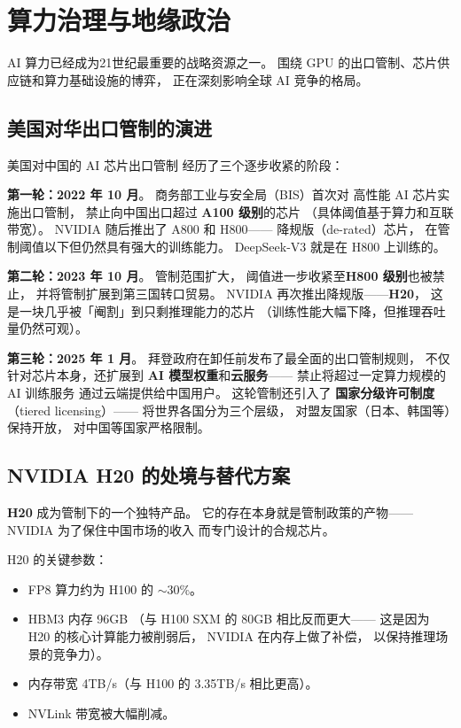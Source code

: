 \section{算力治理与地缘政治}
\label{sec:compute-governance}

AI 算力已经成为21世纪最重要的战略资源之一。
围绕 GPU 的出口管制、芯片供应链和算力基础设施的博弈，
正在深刻影响全球 AI 竞争的格局。

\subsection{美国对华出口管制的演进}

美国对中国的 AI 芯片出口管制
经历了三个逐步收紧的阶段：

\textbf{第一轮：2022 年 10 月}。
商务部工业与安全局（BIS）首次对
高性能 AI 芯片实施出口管制，
禁止向中国出口超过
\textbf{A100 级别}的芯片
（具体阈值基于算力和互联带宽）。
NVIDIA 随后推出了 A800 和 H800——
降规版（de-rated）芯片，
在管制阈值以下但仍然具有强大的训练能力。
DeepSeek-V3 就是在 H800 上训练的。

\textbf{第二轮：2023 年 10 月}。
管制范围扩大，
阈值进一步收紧至\textbf{H800 级别}也被禁止，
并将管制扩展到第三国转口贸易。
NVIDIA 再次推出降规版——\textbf{H20}，
这是一块几乎被「阉割」到只剩推理能力的芯片
（训练性能大幅下降，但推理吞吐量仍然可观）。

\textbf{第三轮：2025 年 1 月}。
拜登政府在卸任前发布了最全面的出口管制规则，
不仅针对芯片本身，还扩展到
\textbf{AI 模型权重}和\textbf{云服务}——
禁止将超过一定算力规模的 AI 训练服务
通过云端提供给中国用户。
这轮管制还引入了
\textbf{国家分级许可制度}（tiered licensing）——
将世界各国分为三个层级，
对盟友国家（日本、韩国等）保持开放，
对中国等国家严格限制。

\subsection{NVIDIA H20 的处境与替代方案}

\textbf{H20} 成为管制下的一个独特产品。
它的存在本身就是管制政策的产物——
NVIDIA 为了保住中国市场的收入
而专门设计的合规芯片。

H20 的关键参数：
\begin{itemize}[noitemsep]
  \item FP8 算力约为 H100 的 $\sim$30\%。
  \item HBM3 内存 96GB
        （与 H100 SXM 的 80GB 相比反而更大——
        这是因为 H20 的核心计算能力被削弱后，
        NVIDIA 在内存上做了补偿，
        以保持推理场景的竞争力）。
  \item 内存带宽 4TB/s（与 H100 的 3.35TB/s 相比更高）。
  \item NVLink 带宽被大幅削减。
\end{itemize}

